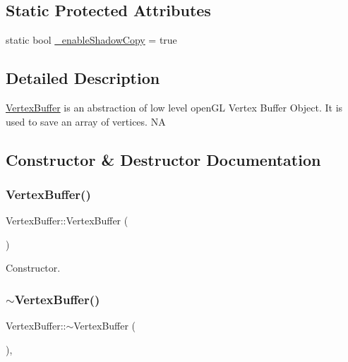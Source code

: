 \subsection*{Static Protected Attributes}
\begin{DoxyCompactItemize}
\item 
static bool \hyperlink{classVertexBuffer_a51e427f3482b0f6872daadeebe22cca3}{\+\_\+enable\+Shadow\+Copy} = true
\end{DoxyCompactItemize}


\subsection{Detailed Description}
\hyperlink{classVertexBuffer}{Vertex\+Buffer} is an abstraction of low level open\+GL Vertex Buffer Object. It is used to save an array of vertices.  NA 

\subsection{Constructor \& Destructor Documentation}
\mbox{\label{classVertexBuffer_adb25d82a47ad82d5b69a75ac111401b8}} 
\subsubsection{\texorpdfstring{Vertex\+Buffer()}{VertexBuffer()}\hspace{0.1cm}{\footnotesize\ttfamily [1/2]}}
{\footnotesize\ttfamily Vertex\+Buffer\+::\+Vertex\+Buffer (\begin{DoxyParamCaption}{ }\end{DoxyParamCaption})\hspace{0.3cm}{\ttfamily [protected]}}

Constructor. \mbox{\label{classVertexBuffer_a5216726fdd43b2ae8e1439e347717fdd}} 
\subsubsection{\texorpdfstring{$\sim$\+Vertex\+Buffer()}{~VertexBuffer()}\hspace{0.1cm}{\footnotesize\ttfamily [1/2]}}
{\footnotesize\ttfamily Vertex\+Buffer\+::$\sim$\+Vertex\+Buffer (\begin{DoxyParamCaption}{ }\end{DoxyParamCaption})\hspace{0.3cm}{\ttfamily [protected]}, {\ttfamily [virtual]}}

